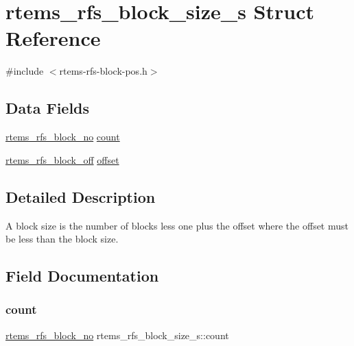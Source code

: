 \hypertarget{structrtems__rfs__block__size__s}{}\section{rtems\+\_\+rfs\+\_\+block\+\_\+size\+\_\+s Struct Reference}
\label{structrtems__rfs__block__size__s}


{\ttfamily \#include $<$rtems-\/rfs-\/block-\/pos.\+h$>$}

\subsection*{Data Fields}
\begin{DoxyCompactItemize}
\item 
\mbox{\hyperlink{rtems-rfs-block-pos_8h_abbf8bb95acf9bd16ed3291f7da518e9a}{rtems\+\_\+rfs\+\_\+block\+\_\+no}} \mbox{\hyperlink{structrtems__rfs__block__size__s_ac5dae2cd5b32ef04187e5762cf664561}{count}}
\item 
\mbox{\hyperlink{rtems-rfs-block-pos_8h_ad32ba1f9be3b667fe3e778d0edfdfff3}{rtems\+\_\+rfs\+\_\+block\+\_\+off}} \mbox{\hyperlink{structrtems__rfs__block__size__s_a80dc690adcf9d6affab46f6d061e2158}{offset}}
\end{DoxyCompactItemize}


\subsection{Detailed Description}
A block size is the number of blocks less one plus the offset where the offset must be less than the block size. 

\subsection{Field Documentation}
\mbox{\label{structrtems__rfs__block__size__s_ac5dae2cd5b32ef04187e5762cf664561}} 
\subsubsection{\texorpdfstring{count}{count}}
{\footnotesize\ttfamily \mbox{\hyperlink{rtems-rfs-block-pos_8h_abbf8bb95acf9bd16ed3291f7da518e9a}{rtems\+\_\+rfs\+\_\+block\+\_\+no}} rtems\+\_\+rfs\+\_\+block\+\_\+size\+\_\+s\+::count}

